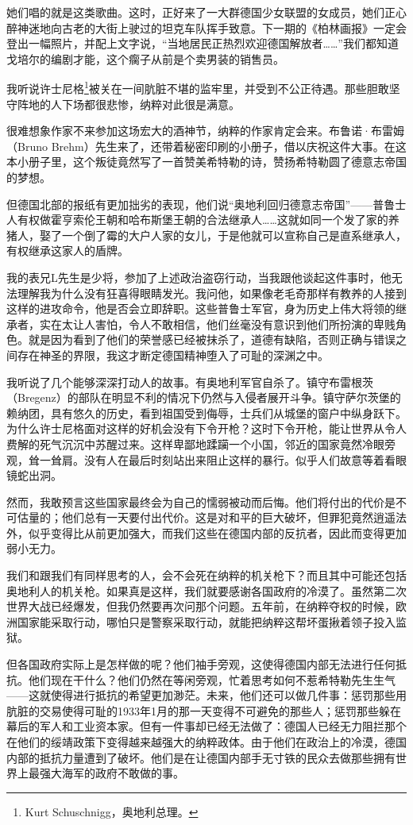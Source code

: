 \documentclass[UTF8]{ctexart}
\begin{document}
她们唱的就是这类歌曲。这时，正好来了一大群德国少女联盟的女成员，她们正心醉神迷地向古老的大街上驶过的坦克车队挥手致意。下一期的《柏林画报》一定会登出一幅照片，并配上文字说，“当地居民正热烈欢迎德国解放者……”我们都知道戈培尔的编剧才能，这个瘸子从前是个卖男装的销售员。

我听说许士尼格\footnote{Kurt Schuschnigg，奥地利总理。}被关在一间肮脏不堪的监牢里，并受到不公正待遇。那些胆敢坚守阵地的人下场都很悲惨，纳粹对此很是满意。

很难想象作家不来参加这场宏大的酒神节，纳粹的作家肯定会来。布鲁诺·布雷姆（Bruno Brehm）先生来了，还带着秘密印刷的小册子，借以庆祝这件大事。在这本小册子里，这个叛徒竟然写了一首赞美希特勒的诗，赞扬希特勒圆了德意志帝国的梦想。

但德国北部的报纸有更加拙劣的表现，他们说“奥地利回归德意志帝国”——普鲁士人有权做霍亨索伦王朝和哈布斯堡王朝的合法继承人……这就如同一个发了家的养猪人，娶了一个倒了霉的大户人家的女儿，于是他就可以宣称自己是直系继承人，有权继承这家人的盾牌。

我的表兄L先生是少将，参加了上述政治盗窃行动，当我跟他谈起这件事时，他无法理解我为什么没有狂喜得眼睛发光。我问他，如果像老毛奇那样有教养的人接到这样的进攻命令，他是否会立即辞职。这些普鲁士军官，身为历史上伟大将领的继承者，实在太让人害怕，令人不敢相信，他们丝毫没有意识到他们所扮演的卑贱角色。就是因为看到了他们的荣誉感已经被抹杀了，道德有缺陷，否则正确与错误之间存在神圣的界限，我这才断定德国精神堕入了可耻的深渊之中。

我听说了几个能够深深打动人的故事。有奥地利军官自杀了。镇守布雷根茨（Bregenz）的部队在明显不利的情况下仍然与入侵者展开斗争。镇守萨尔茨堡的赖纳团，具有悠久的历史，看到祖国受到侮辱，士兵们从城堡的窗户中纵身跃下。为什么许士尼格面对这样的好机会没有下令开枪？这时下令开枪，能让世界从令人费解的死气沉沉中苏醒过来。这样卑鄙地蹂躏一个小国，邻近的国家竟然冷眼旁观，耸一耸肩。没有人在最后时刻站出来阻止这样的暴行。似乎人们故意等着看眼镜蛇出洞。

然而，我敢预言这些国家最终会为自己的懦弱被动而后悔。他们将付出的代价是不可估量的；他们总有一天要付出代价。这是对和平的巨大破坏，但罪犯竟然逍遥法外，似乎变得比从前更加强大，而我们这些在德国内部的反抗者，因此而变得更加弱小无力。

我们和跟我们有同样思考的人，会不会死在纳粹的机关枪下？而且其中可能还包括奥地利人的机关枪。如果真是这样，我们就要感谢各国政府的冷漠了。虽然第二次世界大战已经爆发，但我仍然要再次问那个问题。五年前，在纳粹夺权的时候，欧洲国家能采取行动，哪怕只是警察采取行动，就能把纳粹这帮坏蛋揪着领子投入监狱。

但各国政府实际上是怎样做的呢？他们袖手旁观，这使得德国内部无法进行任何抵抗。他们现在干什么？他们仍然在等闲旁观，忙着思考如何不惹希特勒先生生气——这就使得进行抵抗的希望更加渺茫。未来，他们还可以做几件事：惩罚那些用肮脏的交易使得可耻的1933年1月的那一天变得不可避免的那些人；惩罚那些躲在幕后的军人和工业资本家。但有一件事却已经无法做了：德国人已经无力阻拦那个在他们的绥靖政策下变得越来越强大的纳粹政体。由于他们在政治上的冷漠，德国内部的抵抗力量遭到了破坏。他们是在让德国内部手无寸铁的民众去做那些拥有世界上最强大海军的政府不敢做的事。
\end{document}

